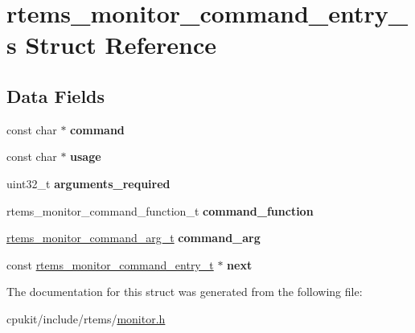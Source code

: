\hypertarget{structrtems__monitor__command__entry__s}{}\section{rtems\+\_\+monitor\+\_\+command\+\_\+entry\+\_\+s Struct Reference}
\label{structrtems__monitor__command__entry__s}
\subsection*{Data Fields}
\begin{DoxyCompactItemize}
\item 
\mbox{\label{structrtems__monitor__command__entry__s_a7384afc8713585ad548cc6172befd4df}} 
const char $\ast$ {\bfseries command}
\item 
\mbox{\label{structrtems__monitor__command__entry__s_afc941f73ebb05a5ce34eddf7c439b0d1}} 
const char $\ast$ {\bfseries usage}
\item 
\mbox{\label{structrtems__monitor__command__entry__s_a4fdb46784a395dd40bc6364d70ed8f3c}} 
uint32\+\_\+t {\bfseries arguments\+\_\+required}
\item 
\mbox{\label{structrtems__monitor__command__entry__s_a3b5eed76e6a4ecbfbf108a57a3c653b0}} 
rtems\+\_\+monitor\+\_\+command\+\_\+function\+\_\+t {\bfseries command\+\_\+function}
\item 
\mbox{\label{structrtems__monitor__command__entry__s_acaee3ba9a528724f405e62b6cd158701}} 
\mbox{\hyperlink{union__rtems__monitor__command__arg__t}{rtems\+\_\+monitor\+\_\+command\+\_\+arg\+\_\+t}} {\bfseries command\+\_\+arg}
\item 
\mbox{\label{structrtems__monitor__command__entry__s_a2f4df861991a5d009f517d163c337ff3}} 
const \mbox{\hyperlink{structrtems__monitor__command__entry__s}{rtems\+\_\+monitor\+\_\+command\+\_\+entry\+\_\+t}} $\ast$ {\bfseries next}
\end{DoxyCompactItemize}


The documentation for this struct was generated from the following file\+:\begin{DoxyCompactItemize}
\item 
cpukit/include/rtems/\mbox{\hyperlink{monitor_8h}{monitor.\+h}}\end{DoxyCompactItemize}
